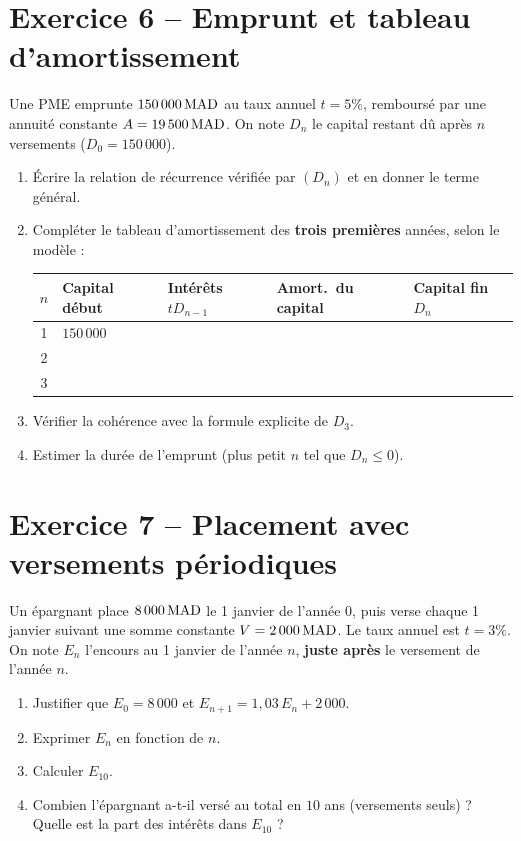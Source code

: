 \documentclass[11pt,a4paper]{article}
\begin{document}
\section*{Exercice 6 -- Emprunt et tableau d'amortissement}

Une PME emprunte $150\,000\,\mathrm{MAD}$ au taux annuel $t=5\%$, remboursé par une annuité constante $A = 19\,500\,\mathrm{MAD}$. On note $D_n$ le capital restant dû après $n$ versements ($D_0 = 150\,000$).

\begin{enumerate}
  \item Écrire la relation de récurrence vérifiée par $(D_n)$ et en donner le terme général.
  \item Compléter le tableau d'amortissement des \textbf{trois premières} années, selon le modèle :

  \medskip
  {\footnotesize
  \noindent
  \begin{tabularx}{\linewidth}{c|>{\centering\arraybackslash}X>{\centering\arraybackslash}X>{\centering\arraybackslash}X>{\centering\arraybackslash}X}
  \toprule
  $n$ & Capital début & Intérêts $t D_{n-1}$ & Amort.\ du capital & Capital fin $D_n$ \\
  \midrule
  1 & $150\,000$ &  &  &  \\
  2 &  &  &  &  \\
  3 &  &  &  &  \\
  \bottomrule
  \end{tabularx}
  }

  \item Vérifier la cohérence avec la formule explicite de $D_3$.
  \item Estimer la durée de l'emprunt (plus petit $n$ tel que $D_n\leq 0$).
\end{enumerate}

\section*{Exercice 7 -- Placement avec versements périodiques}

Un épargnant place $8\,000\,\mathrm{MAD}$ le 1 janvier de l'année 0, puis verse chaque 1 janvier suivant une somme constante $V = 2\,000\,\mathrm{MAD}$. Le taux annuel est $t=3\%$. On note $E_n$ l'encours au 1 janvier de l'année $n$, \textbf{juste après} le versement de l'année $n$.

\begin{enumerate}
  \item Justifier que $E_0 = 8\,000$ et $E_{n+1} = 1{,}03\, E_n + 2\,000$.
  \item Exprimer $E_n$ en fonction de $n$.
  \item Calculer $E_{10}$.
  \item Combien l'épargnant a-t-il versé au total en $10$ ans (versements seuls) ? Quelle est la part des intérêts dans $E_{10}$ ?
\end{enumerate}
\end{document}
